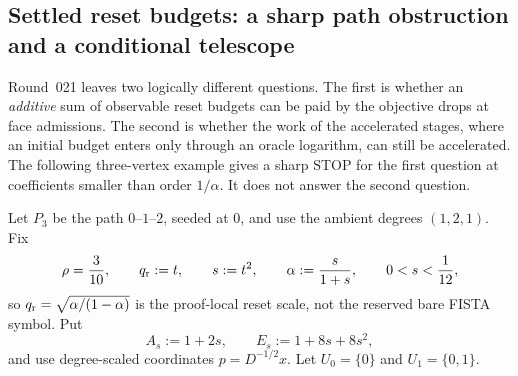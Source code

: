 \subsection{Settled reset budgets: a sharp path obstruction and a
conditional telescope}
\label{sec:settled-reset-budget-amortization}

Round~021 leaves two logically different questions.  The first is whether an
\emph{additive} sum of observable reset budgets can be paid by the objective
drops at face admissions.  The second is whether the work of the accelerated
stages, where an initial budget enters only through an oracle logarithm, can
still be accelerated.  The following three-vertex example gives a sharp STOP
for the first question at coefficients smaller than order $1/\alpha$.  It does
not answer the second question.

Let $P_3$ be the path $0$--$1$--$2$, seeded at $0$, and use the ambient
degrees $(1,2,1)$.  Fix
\begin{equation}
 \rho=\frac3{10},\qquad
 q_{\rm r}:=t,\qquad s:=t^2,
 \qquad \alpha:=\frac{s}{1+s},
 \qquad 0<s<\frac1{12},
 \label{eq:path-three-reset-parameters}
\end{equation}
so $q_{\rm r}=\sqrt{\alpha/(1-\alpha)}$ is the proof-local reset scale, not
the reserved bare FISTA symbol.  Put
\begin{equation}
 A_s:=1+2s,\qquad E_s:=1+8s+8s^2,
 \label{eq:path-three-reset-polynomials}
\end{equation}
and use degree-scaled coordinates $p=D^{-1/2}x$.  Let
$U_0=\{0\}$ and $U_1=\{0,1\}$.


